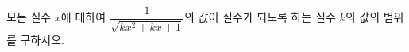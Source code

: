 \hspace*{2mm}\begin{minipage}[t]{\dimexpr\linewidth-2mm\relax}\vspace{0pt}
모든 실수 $x$에 대하여 $\dfrac{1}{\sqrt{kx^2+kx+1}}$의 값이 실수가 되도록 하는 실수 $k$의 값의 범위를 구하시오.\end{minipage}
